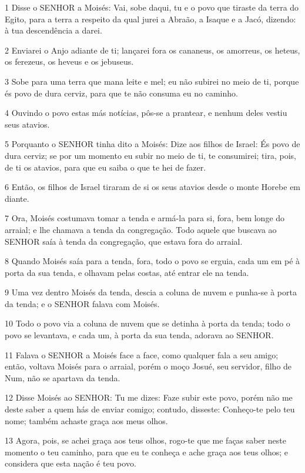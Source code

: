 \par 1 Disse o SENHOR a Moisés: Vai, sobe daqui, tu e o povo que tiraste da terra do Egito, para a terra a respeito da qual jurei a Abraão, a Isaque e a Jacó, dizendo: à tua descendência a darei.
\par 2 Enviarei o Anjo adiante de ti; lançarei fora os cananeus, os amorreus, os heteus, os ferezeus, os heveus e os jebuseus.
\par 3 Sobe para uma terra que mana leite e mel; eu não subirei no meio de ti, porque és povo de dura cerviz, para que te não consuma eu no caminho.
\par 4 Ouvindo o povo estas más notícias, pôs-se a prantear, e nenhum deles vestiu seus atavios.
\par 5 Porquanto o SENHOR tinha dito a Moisés: Dize aos filhos de Israel: És povo de dura cerviz; se por um momento eu subir no meio de ti, te consumirei; tira, pois, de ti os atavios, para que eu saiba o que te hei de fazer.
\par 6 Então, os filhos de Israel tiraram de si os seus atavios desde o monte Horebe em diante.
\par 7 Ora, Moisés costumava tomar a tenda e armá-la para si, fora, bem longe do arraial; e lhe chamava a tenda da congregação. Todo aquele que buscava ao SENHOR saía à tenda da congregação, que estava fora do arraial.
\par 8 Quando Moisés saía para a tenda, fora, todo o povo se erguia, cada um em pé à porta da sua tenda, e olhavam pelas costas, até entrar ele na tenda.
\par 9 Uma vez dentro Moisés da tenda, descia a coluna de nuvem e punha-se à porta da tenda; e o SENHOR falava com Moisés.
\par 10 Todo o povo via a coluna de nuvem que se detinha à porta da tenda; todo o povo se levantava, e cada um, à porta da sua tenda, adorava ao SENHOR.
\par 11 Falava o SENHOR a Moisés face a face, como qualquer fala a seu amigo; então, voltava Moisés para o arraial, porém o moço Josué, seu servidor, filho de Num, não se apartava da tenda.
\par 12 Disse Moisés ao SENHOR: Tu me dizes: Faze subir este povo, porém não me deste saber a quem hás de enviar comigo; contudo, disseste: Conheço-te pelo teu nome; também achaste graça aos meus olhos.
\par 13 Agora, pois, se achei graça aos teus olhos, rogo-te que me faças saber neste momento o teu caminho, para que eu te conheça e ache graça aos teus olhos; e considera que esta nação é teu povo.
